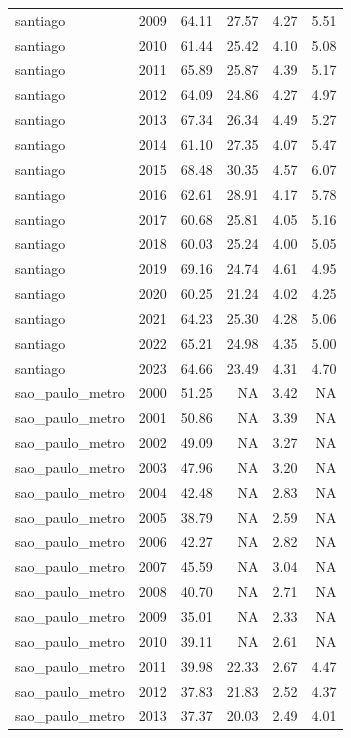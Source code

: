 \begin{table}[!htbp]
\begin{tabular}{ll
rrrr
}
santiago & 2009 & 64.11 & 27.57 & 4.27 & 5.51 \\
santiago & 2010 & 61.44 & 25.42 & 4.10 & 5.08 \\
santiago & 2011 & 65.89 & 25.87 & 4.39 & 5.17 \\
santiago & 2012 & 64.09 & 24.86 & 4.27 & 4.97 \\
santiago & 2013 & 67.34 & 26.34 & 4.49 & 5.27 \\
santiago & 2014 & 61.10 & 27.35 & 4.07 & 5.47 \\
santiago & 2015 & 68.48 & 30.35 & 4.57 & 6.07 \\
santiago & 2016 & 62.61 & 28.91 & 4.17 & 5.78 \\
santiago & 2017 & 60.68 & 25.81 & 4.05 & 5.16 \\
santiago & 2018 & 60.03 & 25.24 & 4.00 & 5.05 \\
santiago & 2019 & 69.16 & 24.74 & 4.61 & 4.95 \\
santiago & 2020 & 60.25 & 21.24 & 4.02 & 4.25 \\
santiago & 2021 & 64.23 & 25.30 & 4.28 & 5.06 \\
santiago & 2022 & 65.21 & 24.98 & 4.35 & 5.00 \\
santiago & 2023 & 64.66 & 23.49 & 4.31 & 4.70 \\
sao_paulo_metro & 2000 & 51.25 &  NA & 3.42 &  NA \\
sao_paulo_metro & 2001 & 50.86 &  NA & 3.39 &  NA \\
sao_paulo_metro & 2002 & 49.09 &  NA & 3.27 &  NA \\
sao_paulo_metro & 2003 & 47.96 &  NA & 3.20 &  NA \\
sao_paulo_metro & 2004 & 42.48 &  NA & 2.83 &  NA \\
sao_paulo_metro & 2005 & 38.79 &  NA & 2.59 &  NA \\
sao_paulo_metro & 2006 & 42.27 &  NA & 2.82 &  NA \\
sao_paulo_metro & 2007 & 45.59 &  NA & 3.04 &  NA \\
sao_paulo_metro & 2008 & 40.70 &  NA & 2.71 &  NA \\
sao_paulo_metro & 2009 & 35.01 &  NA & 2.33 &  NA \\
sao_paulo_metro & 2010 & 39.11 &  NA & 2.61 &  NA \\
sao_paulo_metro & 2011 & 39.98 & 22.33 & 2.67 & 4.47 \\
sao_paulo_metro & 2012 & 37.83 & 21.83 & 2.52 & 4.37 \\
sao_paulo_metro & 2013 & 37.37 & 20.03 & 2.49 & 4.01 \\

\end{tabular}
\end{table}
